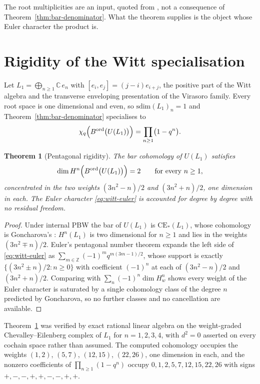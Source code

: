 \documentclass[11pt,reqno]{amsart}
\newtheorem{theorem}{Theorem}[section]
\theoremstyle{definition}
\theoremstyle{remark}
\providecommand{\sdim}{\mathrm{sdim}}
\providecommand{\CE}{\mathrm{CE}}
\begin{document}
The root multiplicities are an input, quoted from \cite{GN97}, not a
consequence of Theorem~\ref{thm:bar-denominator}. What the theorem
supplies is the object whose Euler character the product is.

\section{Rigidity of the Witt specialisation}

Let $L_1 = \bigoplus_{n\ge1}\mathbb C\,e_n$ with
$[e_i,e_j]=(j-i)e_{i+j}$, the positive part of the Witt algebra and the
transverse enveloping presentation of the Virasoro family. Every root
space is one dimensional and even, so $\sdim (L_1)_n = 1$ and
Theorem~\ref{thm:bar-denominator} specialises to
\begin{equation}
\label{eq:witt-euler}
  \chi_q\Bigl(B^{\mathrm{ord}}\bigl(U(L_1)\bigr)\Bigr)
  = \prod_{n\ge1}\bigl(1-q^n\bigr).
\end{equation}

\begin{theorem}[Pentagonal rigidity]
\label{thm:pentagonal-rigidity}
The bar cohomology of $U(L_1)$ satisfies
\[
  \dim H^n\Bigl(B^{\mathrm{ord}}\bigl(U(L_1)\bigr)\Bigr) = 2
  \qquad\text{for every } n\ge1,
\]
concentrated in the two weights $(3n^2-n)/2$ and $(3n^2+n)/2$, one
dimension in each. The Euler character \eqref{eq:witt-euler} is
accounted for degree by degree with no residual freedom.
\end{theorem}

\begin{proof}
Under internal PBW the bar of $U(L_1)$ is $\CE_*(L_1)$, whose cohomology
is Goncharova's \cite{Gon73}: $H^n(L_1)$ is two dimensional for $n\ge1$
and lies in the weights $(3n^2\mp n)/2$. Euler's pentagonal number
theorem expands the left side of \eqref{eq:witt-euler} as
$\sum_{m\in\mathbb Z}(-1)^m q^{m(3m-1)/2}$, whose support is exactly
$\{(3n^2\pm n)/2 : n\ge0\}$ with coefficient $(-1)^n$ at each of
$(3n^2-n)/2$ and $(3n^2+n)/2$. Comparing with
$\sum_n(-1)^n\dim H^n_w$ shows every weight of the Euler character is
saturated by a single cohomology class of the degree $n$ predicted by
Goncharova, so no further classes and no cancellation are available.
\end{proof}

Theorem~\ref{thm:pentagonal-rigidity} was verified by exact rational
linear algebra on the weight-graded Chevalley--Eilenberg complex of $L_1$
for $n=1,2,3,4$, with $d^2=0$ asserted on every cochain space rather than
assumed. The computed cohomology occupies the weights
$(1,2)$, $(5,7)$, $(12,15)$, $(22,26)$, one dimension in each, and the
nonzero coefficients of $\prod_{n\ge1}(1-q^n)$ occupy
$0,1,2,5,7,12,15,22,26$ with signs $+,-,-,+,+,-,-,+,+$.
\end{document}
